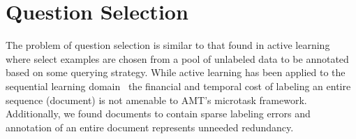 \section{Question Selection}
\label{sec:selection}

\eat{

}

  
The problem of question selection is similar to that found in active learning where select examples are chosen from a pool of unlabeled data to be annotated based on some querying strategy.  While active learning has been applied to the sequential learning domain~\cite{Settles:2008:AAL:1613715.1613855,Cheng:2008:MMA:1425611.1425645} the financial and temporal cost of labeling an entire sequence (document) is not amenable to AMT’s microtask framework.  Additionally, we found documents to contain sparse labeling errors and annotation of an entire document represents unneeded redundancy.  

